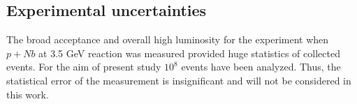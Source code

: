 



\subsection{\label{Uncertainties} Experimental uncertainties} 
 
The broad acceptance and overall high luminosity for the experiment when $p + Nb$ at 3.5 GeV reaction was measured 
provided huge statistics of collected events. 
For the aim of present study $10^8$ events 
have been analyzed. Thus, the statistical error of the measurement is insignificant and will not be considered in this work. 
 
